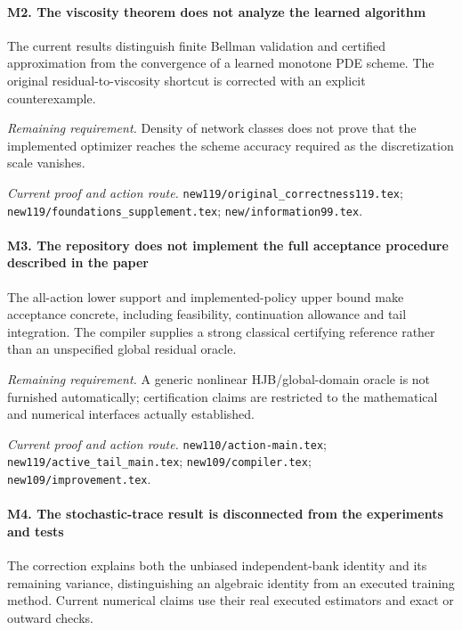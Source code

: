 \paragraph{M2. The viscosity theorem does not analyze the learned algorithm}

The current results distinguish finite Bellman validation and certified approximation from the convergence of a learned monotone PDE scheme. The original residual-to-viscosity shortcut is corrected with an explicit counterexample.

\par\emph{Remaining requirement.} Density of network classes does not prove that the implemented optimizer reaches the scheme accuracy required as the discretization scale vanishes.

\par\emph{Current proof and action route.} \nolinkurl{new119/original_correctness119.tex}; \nolinkurl{new119/foundations_supplement.tex}; \nolinkurl{new/information99.tex}.

\paragraph{M3. The repository does not implement the full acceptance procedure described in the paper}

The all-action lower support and implemented-policy upper bound make acceptance concrete, including feasibility, continuation allowance and tail integration. The compiler supplies a strong classical certifying reference rather than an unspecified global residual oracle.

\par\emph{Remaining requirement.} A generic nonlinear HJB/\allowbreak{}global-domain oracle is not furnished automatically; certification claims are restricted to the mathematical and numerical interfaces actually established.

\par\emph{Current proof and action route.} \nolinkurl{new110/action-main.tex}; \nolinkurl{new119/active_tail_main.tex}; \nolinkurl{new109/compiler.tex}; \nolinkurl{new109/improvement.tex}.

\paragraph{M4. The stochastic-trace result is disconnected from the experiments and tests}

The correction explains both the unbiased independent-bank identity and its remaining variance, distinguishing an algebraic identity from an executed training method. Current numerical claims use their real executed estimators and exact or outward checks.

